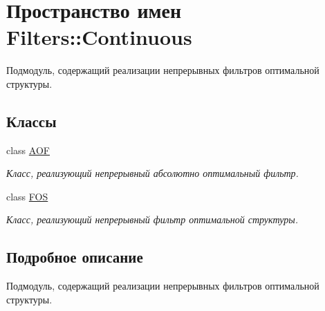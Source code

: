 \hypertarget{namespace_filters_1_1_continuous}{}\section{Пространство имен Filters\+:\+:Continuous}
\label{namespace_filters_1_1_continuous}


Подмодуль, содержащий реализации непрерывных фильтров оптимальной структуры.  


\subsection*{Классы}
\begin{DoxyCompactItemize}
\item 
class \hyperlink{class_filters_1_1_continuous_1_1_a_o_f}{A\+OF}
\begin{DoxyCompactList}\small\item\em Класс, реализующий непрерывный абсолютно оптимальный фильтр. \end{DoxyCompactList}\item 
class \hyperlink{class_filters_1_1_continuous_1_1_f_o_s}{F\+OS}
\begin{DoxyCompactList}\small\item\em Класс, реализующий непрерывный фильтр оптимальной структуры. \end{DoxyCompactList}\end{DoxyCompactItemize}


\subsection{Подробное описание}
Подмодуль, содержащий реализации непрерывных фильтров оптимальной структуры. 